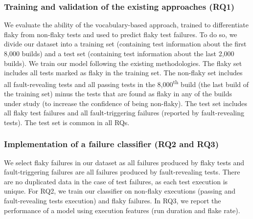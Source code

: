 \subsubsection{Training and validation of the existing approaches (RQ1)} 
We evaluate the ability of the vocabulary-based approach, trained to differentiate flaky from non-flaky tests and used to predict flaky test failures. To do so, we divide our dataset into a training set (containing test information about the first 8,000 builds) and a test set (containing test information about the last 2,000 builds). We train our model following the existing methodologies. The flaky set includes all tests marked as flaky in the training set. 
The non-flaky set includes all fault-revealing tests and all passing tests in the 8,000\textsuperscript{th} build (\ie the last build of the training set) minus the tests that are found as flaky in any of the builds under study (to increase the confidence of being non-flaky). The test set includes all flaky test failures and all fault-triggering failures (reported by fault-revealing tests). The test set is common in all RQs.

\subsubsection{Implementation of a failure classifier (RQ2 and RQ3)}
We select flaky failures in our dataset as all failures produced by flaky tests and fault-triggering failures are all failures produced by fault-revealing tests. There are no duplicated data in the case of test failures, as each test execution is unique. For RQ2, we train our classifier on non-flaky executions (passing and fault-revealing tests execution) and flaky failures. In RQ3, we report the performance of a model using execution features (run duration and flake rate).

